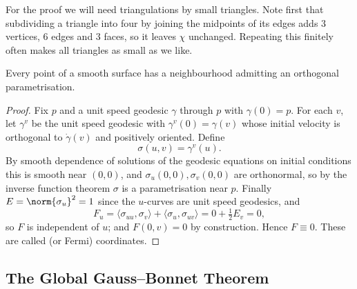For the proof we will need triangulations by small triangles. Note first that subdividing a triangle into four by joining the midpoints of its edges adds $3$ vertices, $6$ edges and $3$ faces, so it leaves $\chi$ unchanged. Repeating this finitely often makes all triangles as small as we like.

\begin{proposition}
    Every point of a smooth surface has a neighbourhood admitting an orthogonal parametrisation.
\end{proposition}
\begin{proof}
    Fix $p$ and a unit speed geodesic $\gamma$ through $p$ with $\gamma(0) = p$. For each $v$, let $\gamma^v$ be the unit speed geodesic with $\gamma^v(0) = \gamma(v)$ whose initial velocity is orthogonal to $\dot\gamma(v)$ and positively oriented. Define
    $$
    \sigma(u,v) = \gamma^v(u).
    $$
    By smooth dependence of solutions of the geodesic equations on initial conditions this is smooth near $(0,0)$, and $\sigma_u(0,0), \sigma_v(0,0)$ are orthonormal, so by the inverse function theorem $\sigma$ is a parametrisation near $p$. Finally $E = \norm{\sigma_u}^2 = 1$ since the $u$-curves are unit speed geodesics, and
    $$
    F_u = \langle \sigma_{uu},\sigma_v\rangle + \langle \sigma_u,\sigma_{uv}\rangle = 0 + \tfrac12 E_v = 0,
    $$
    so $F$ is independent of $u$; and $F(0,v) = 0$ by construction. Hence $F \equiv 0$. These are called  (or Fermi) coordinates.
\end{proof}

\subsection{The Global Gauss--Bonnet Theorem}

